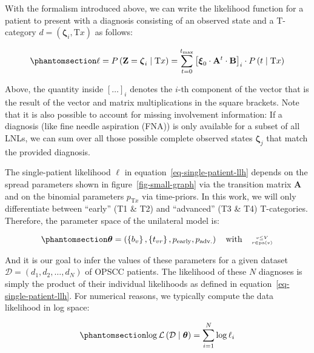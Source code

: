 \documentclass[
  sn-mathphys-num,
]{sn-jnl}
\begin{document}
With the formalism introduced above, we can write the likelihood
function for a patient to present with a diagnosis consisting of an
observed state and a T-category
\(d = \left( \boldsymbol{\zeta}_i, \text{T}x \right)\) as follows:

\begin{equation}\phantomsection\label{eq-single-patient-llh}{
\ell = P \left( \mathbf{Z} = \boldsymbol{\zeta}_i \mid \text{T}x \right) = \sum_{t=0}^{t_\text{max}} \left[ \boldsymbol{\xi}_0 \cdot \mathbf{A}^t \cdot \mathbf{B} \right]_i \cdot P \left( t \mid \text{T}x \right)
}\end{equation}

Above, the quantity inside \(\left[ \ldots \right]_i\) denotes the
\(i\)-th component of the vector that is the result of the vector and
matrix multiplications in the square brackets. Note that it is also
possible to account for missing involvement information: If a diagnosis
(like fine needle aspiration (FNA)) is only available for a subset of
all LNLs, we can sum over all those possible complete observed states
\(\boldsymbol{\zeta}_j\) that match the provided diagnosis.

The single-patient likelihood \(\ell\) in
equation~\ref{eq-single-patient-llh} depends on the spread parameters
shown in figure~\ref{fig-small-graph} via the transition matrix
\(\mathbf{A}\) and on the binomial parameters \(p_{\text{T}x}\) via
time-priors. In this work, we will only differentiate between ``early''
(T1 \& T2) and ``advanced'' (T3 \& T4) T-categories. Therefore, the
parameter space of the unilateral model is:

\begin{equation}\phantomsection\label{eq-param-space}{
\boldsymbol{\theta} = \left( \left\{ b_v \right\}, \left\{ t_{vr} \right\}, p_\text{early}, p_\text{adv.} \right) \quad \text{with} \quad \genfrac{}{}{0pt}{2}{v\leq V}{r\in\operatorname{pa}(v)}
}\end{equation}

And it is our goal to infer the values of these parameters for a given
dataset \(\mathcal{D} = \left( d_1, d_2, \ldots, d_N \right)\) of OPSCC
patients. The likelihood of these \(N\) diagnoses is simply the product
of their individual likelihoods as defined in
equation~\ref{eq-single-patient-llh}. For numerical reasons, we
typically compute the data likelihood in log space:

\begin{equation}\phantomsection\label{eq-log-likelihood}{
\log \mathcal{L} \left( \mathcal{D} \mid \boldsymbol{\theta} \right) = \sum_{i=1}^N \log \ell_i
}\end{equation}
\end{document}
